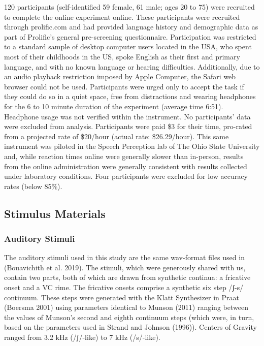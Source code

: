 \documentclass[
  letterpaper,
  DIV=11,
  numbers=noendperiod]{scrartcl}
\begin{document}
120 participants (self-identified 59 female, 61 male; ages 20 to 75)
were recruited to complete the online experiment online. These
participants were recruited through prolific.com and had provided
language history and demographic data as part of Prolific's general
pre-screening questionnaire. Participation was restricted to a standard
sample of desktop computer users located in the USA, who spent most of
their childhoods in the US, spoke English as their first and primary
language, and with no known language or hearing difficulties.
Additionally, due to an audio playback restriction imposed by Apple
Computer, the Safari web browser could not be used. Participants were
urged only to accept the task if they could do so in a quiet space, free
from distractions and wearing headphones for the 6 to 10 minute duration
of the experiment (average time 6:51). Headphone usage was not verified
within the instrument. No participants' data were excluded from
analysis. Participants were paid \$3 for their time, pro-rated from a
projected rate of \$20/hour (actual rate: \$26.29/hour). This same
instrument was piloted in the Speech Perception lab of The Ohio State
University and, while reaction times online were generally slower than
in-person, results from the online administration were generally
consistent with results collected under laboratory conditions. Four
participants were excluded for low accuracy rates (below 85\%).

\subsection{Stimulus Materials}\label{sub-stimuli}

\subsubsection{Auditory Stimuli}\label{sub-stimuli-auditory}

The auditory stimuli used in this study are the same wav-format files
used in (Bouavichith et al. 2019). The stimuli, which were generously
shared with us, contain two parts, both of which are drawn from
synthetic continua: a fricative onset and a VC rime. The fricative
onsets comprise a synthetic six step /ʃ-s/ continuum. These steps were
generated with the Klatt Synthesizer in Praat (Boersma 2001) using
parameters identical to Munson (2011) ranging between the values of
Munson's second and eighth continuum steps (which were, in turn, based
on the parameters used in Strand and Johnson (1996)). Centers of Gravity
ranged from 3.2 kHz (/ʃ/-like) to 7 kHz (/s/-like).
\end{document}

